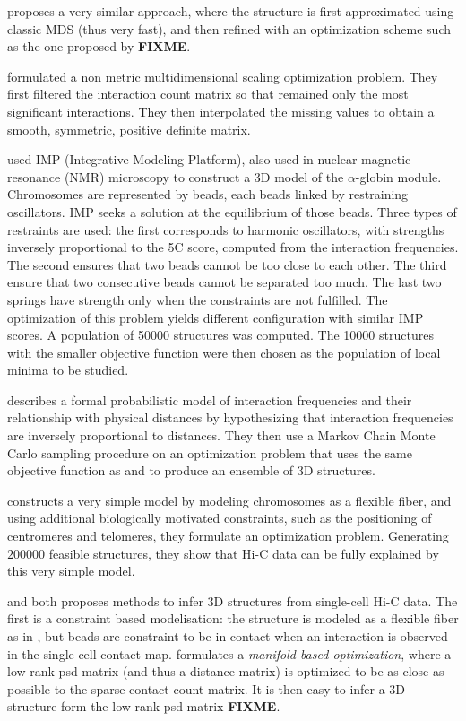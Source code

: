 \citet{lesne:3d} proposes a very similar approach, where the structure is
first approximated using classic MDS (thus very fast), and then refined with
an optimization scheme such as the one proposed by \citet{duan:three}
\textbf{FIXME}.

\citet{ben-elazar:spatial} formulated a non metric multidimensional scaling
optimization problem. They first filtered the interaction count matrix so that
remained only the most significant interactions. They then interpolated the
missing values to obtain a smooth, symmetric, positive definite matrix.

\citet{bau:three-dimensional} used IMP (Integrative Modeling Platform), also
used in nuclear magnetic resonance (NMR) microscopy to construct a 3D model of
the $\alpha$-globin module. Chromosomes are represented by beads, each beads
linked by restraining oscillators. IMP seeks a solution at the equilibrium of
those beads. Three types of restraints are used: the first  corresponds to
harmonic oscillators, with strengths inversely proportional to the 5C
score, computed from the interaction frequencies. The second ensures that two
beads cannot be too close to each other. The third ensure that two consecutive
beads cannot be separated too much. The last two springs have strength only
when the constraints are not fulfilled. The optimization of this problem
yields different configuration with similar IMP scores. A population of 50000
structures was computed. The 10000 structures with the smaller objective
function were then chosen as the population of local minima to be studied.

\citet{rousseau:three} describes a formal probabilistic model of interaction
frequencies and their relationship with physical distances by hypothesizing
that interaction frequencies are inversely proportional to distances. They
then use a Markov Chain Monte Carlo sampling procedure on an optimization
problem that uses the same objective function as \citet{tanizawa:mapping} and
\citet{duan:three} to produce an ensemble of 3D structures.

\citet{tjong:physical} constructs a very simple model by modeling chromosomes
as a flexible fiber, and using additional biologically motivated constraints,
such as the positioning of centromeres and telomeres, they formulate an
optimization problem. Generating $200000$ feasible structures, they show that
Hi-C data can be fully explained by this very simple model.

\citet{nagano:single-cell} and \citet{paulsen:manifold} both proposes methods
to infer 3D structures from single-cell Hi-C data. The first is a constraint
based modelisation: the structure is modeled as a flexible fiber as in
\citet{tjong:physical}, but beads are constraint to be in contact when an
interaction is observed in the single-cell contact map.
\citet{paulsen:manifold} formulates a \textit{manifold based optimization},
where a low rank psd matrix (and thus a distance matrix) is optimized to be as
close as possible to the sparse contact count matrix. It is then easy to infer
a 3D structure form the low rank psd matrix \textbf{FIXME}.

